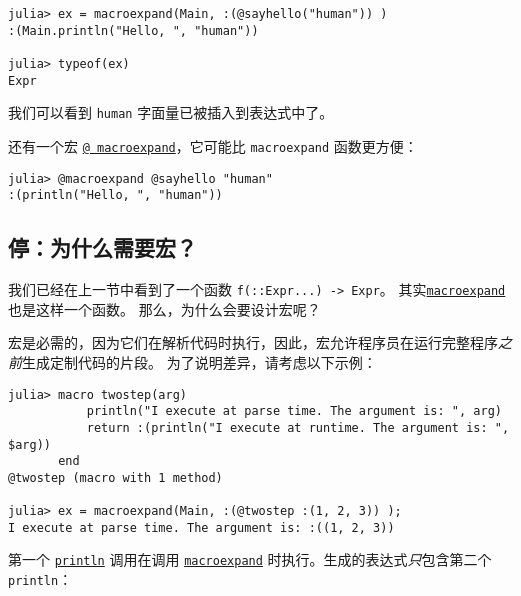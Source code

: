 \begin{lstlisting}
julia> ex = macroexpand(Main, :(@sayhello("human")) )
:(Main.println("Hello, ", "human"))

julia> typeof(ex)
Expr
\end{lstlisting}



我们可以看到 \texttt{{\textquotedbl}human{\textquotedbl}} 字面量已被插入到表达式中了。



还有一个宏 \href{@ ref}{\texttt{@ macroexpand}}，它可能比 \texttt{macroexpand} 函数更方便：




\begin{verbatim}
julia> @macroexpand @sayhello "human"
:(println("Hello, ", "human"))
\end{verbatim}



\hypertarget{3309771807091105309}{}


\subsection{停：为什么需要宏？}



我们已经在上一节中看到了一个函数 \texttt{f(::Expr...) -> Expr}。 其实\hyperlink{8018172489611994488}{\texttt{macroexpand}}也是这样一个函数。 那么，为什么会要设计宏呢？



宏是必需的，因为它们在解析代码时执行，因此，宏允许程序员在运行完整程序\emph{之前}生成定制代码的片段。 为了说明差异，请考虑以下示例：




\begin{lstlisting}
julia> macro twostep(arg)
           println("I execute at parse time. The argument is: ", arg)
           return :(println("I execute at runtime. The argument is: ", $arg))
       end
@twostep (macro with 1 method)

julia> ex = macroexpand(Main, :(@twostep :(1, 2, 3)) );
I execute at parse time. The argument is: :((1, 2, 3))
\end{lstlisting}



第一个 \hyperlink{783803254548423222}{\texttt{println}} 调用在调用 \hyperlink{8018172489611994488}{\texttt{macroexpand}} 时执行。生成的表达式\emph{只}包含第二个 \texttt{println}：




